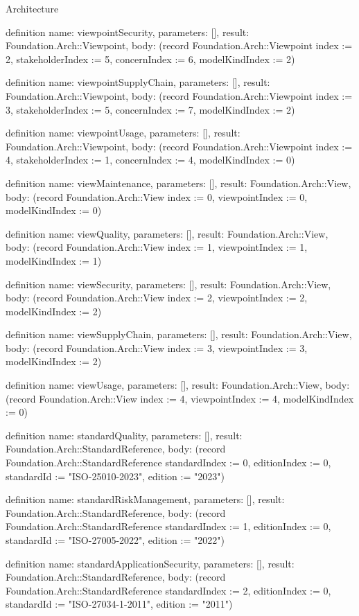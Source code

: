 \begin{lexlean}{Architecture}
\begin{semanticmodule}
definition{
  name: viewpointSecurity,
  parameters: [],
  result: Foundation.Arch::Viewpoint,
  body: (record Foundation.Arch::Viewpoint {index := 2, stakeholderIndex := 5, concernIndex := 6, modelKindIndex := 2})
}

definition{
  name: viewpointSupplyChain,
  parameters: [],
  result: Foundation.Arch::Viewpoint,
  body: (record Foundation.Arch::Viewpoint {index := 3, stakeholderIndex := 5, concernIndex := 7, modelKindIndex := 2})
}

definition{
  name: viewpointUsage,
  parameters: [],
  result: Foundation.Arch::Viewpoint,
  body: (record Foundation.Arch::Viewpoint {index := 4, stakeholderIndex := 1, concernIndex := 4, modelKindIndex := 0})
}

definition{
  name: viewMaintenance,
  parameters: [],
  result: Foundation.Arch::View,
  body: (record Foundation.Arch::View {index := 0, viewpointIndex := 0, modelKindIndex := 0})
}

definition{
  name: viewQuality,
  parameters: [],
  result: Foundation.Arch::View,
  body: (record Foundation.Arch::View {index := 1, viewpointIndex := 1, modelKindIndex := 1})
}

definition{
  name: viewSecurity,
  parameters: [],
  result: Foundation.Arch::View,
  body: (record Foundation.Arch::View {index := 2, viewpointIndex := 2, modelKindIndex := 2})
}

definition{
  name: viewSupplyChain,
  parameters: [],
  result: Foundation.Arch::View,
  body: (record Foundation.Arch::View {index := 3, viewpointIndex := 3, modelKindIndex := 2})
}

definition{
  name: viewUsage,
  parameters: [],
  result: Foundation.Arch::View,
  body: (record Foundation.Arch::View {index := 4, viewpointIndex := 4, modelKindIndex := 0})
}

definition{
  name: standardQuality,
  parameters: [],
  result: Foundation.Arch::StandardReference,
  body: (record Foundation.Arch::StandardReference {standardIndex := 0, editionIndex := 0, standardId := "ISO-25010-2023", edition := "2023"})
}

definition{
  name: standardRiskManagement,
  parameters: [],
  result: Foundation.Arch::StandardReference,
  body: (record Foundation.Arch::StandardReference {standardIndex := 1, editionIndex := 0, standardId := "ISO-27005-2022", edition := "2022"})
}

definition{
  name: standardApplicationSecurity,
  parameters: [],
  result: Foundation.Arch::StandardReference,
  body: (record Foundation.Arch::StandardReference {standardIndex := 2, editionIndex := 0, standardId := "ISO-27034-1-2011", edition := "2011"})
}


\end{semanticmodule}
\end{lexlean}

